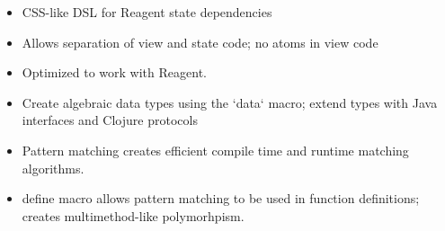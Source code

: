 






\medskip



\vspace{-0.2cm}
\vspace{0.2cm}

\begin{itemize}
  \item CSS-like DSL for Reagent state dependencies
  \item Allows separation of view and state code; no atoms in view code
  \item Optimized to work with Reagent.
\end{itemize}

\divider

\vspace{0.2cm}
\begin{itemize}
    \item Create algebraic data types using the `data` macro; extend types with Java interfaces and Clojure protocols
    \item Pattern matching creates efficient compile time and runtime matching algorithms.
    \item define macro allows pattern matching to be used in function definitions; creates multimethod-like polymorhpism.
\end{itemize}


